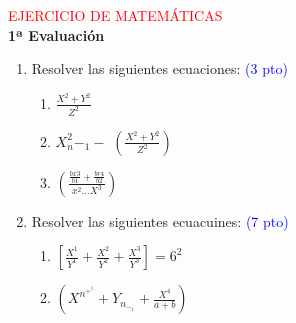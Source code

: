\documentclass[10pt,a4paper]{article}
\begin{document}
	\begin{center}
	\large \textcolor{red}{EJERCICIO DE MATEMÁTICAS} \bigskip  \\
	\large \textbf{1ª Evaluación} \\
	\end{center}
	\begin{enumerate}
		\item Resolver las siguientes ecuaciones: \textcolor{blue}{(3 pto)} \\
		\begin{enumerate}
		\item $\frac {X^2+Y^2}{Z^2} $
		\item $X^2_n - _1 - $ $( \frac {X^2+Y^2}{Z^2}) $
		\item $(\frac{\frac{bx3}{b1} + \frac{br4}{b2}}{x^2 \ldots X^3}) $
		\end{enumerate}
		\item Resolver las siguientes ecuacuines: \textcolor{blue}{(7 pto)}
		\begin{enumerate}
		 \item $[\frac {X^1}{Y^1}+ \frac {X^2}{Y^2}+ \frac {X^3}{Y^3}] = 6^2$
		\item $(X^n^+^1 + Y_n_-_1 + \frac{X^4}{a+b} )$
		\end{enumerate}
	\end{enumerate}
\end{document}
